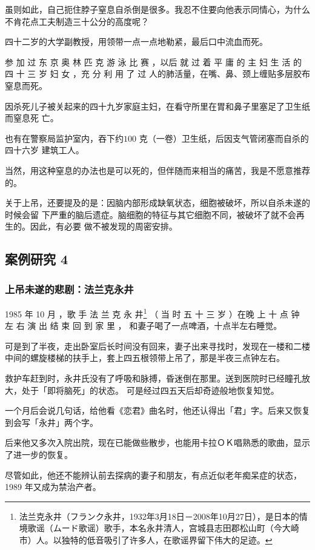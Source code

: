 \documentclass[UTF8]{ctexart}
\begin{document}
虽则如此，自己扼住脖子窒息自杀倒是很多。我忍不住要向他表示同情心，为什么不肯花点工夫制造三十公分的高度呢？

四十二岁的大学副教授，用领带一点一点地勒紧，最后口中流血而死。

参 加 过 东 京 奥 林 匹 克 游 泳 比 赛 ，以后 就 过 着 平 庸 的 主 妇 生 活 的 四 十 三 岁 妇 女 ，充 分 利 用 了 过 人的肺活量，在嘴、鼻、颈上缠贴多层胶布窒息而死。

因杀死儿子被关起来的四十九岁家庭主妇，在看守所里在胃和鼻子里塞足了卫生纸而窒息死
亡。

也有在警察局监护室内，吞下约$100$ 克（一卷）卫生纸，后因支气管闭塞而自杀的四十六岁
建筑工人。

当然，用这种窒息的办法也是可以死的，但伴随而来相当的痛苦，我是不愿意推荐的。

关于上吊，还要提及的是：因脑内部形成缺氧状态，细胞被破坏，所以自杀未遂的时候会留
下严重的脑后遗症。脑细胞的特征与其它细胞不同，被破坏了就不会再生的。因此，有必要
做不被发现的周密安排。

\subsection{案例研究 4}
\subsubsection*{上吊未遂的悲剧：法兰克永井}

1985 年 10 月 ，歌 手 法 兰 克 永 井\footnote{法兰克永井（フランク永井，1932年3月18日－2008年10月27日），是日本的情境歌谣（ムード歌谣）歌手，本名永井清人，宫城县志田郡松山町（今大崎市）人。以独特的低音吸引了许多人，在歌谣界留下伟大的足迹。} （ 当 时 五 十 三 岁 ）在晚 上 十 点 钟 左 右 演 出 结 束 回 到 家 里 ， 和妻子喝了一点啤酒，十点半左右睡觉。

可是到了半夜，走出卧室后长时间没有回来，妻子出来寻找时，发现在一楼和二楼中间的螺旋楼梯的扶手上，套上四五根领带上吊了，那是半夜三点钟左右。

救护车赶到时，永井氏没有了呼吸和脉搏，昏迷倒在那里。送到医院时已经瞳孔放大，处于「即将脑死」的状态。
可是经过四五天后却奇迹般地恢复知觉。

一个月后会说几句话，给他看《恋君》曲名时，他还认得出「君」字。后来又恢复到会写「永井」两个字。

后来他又多次入院出院，现在已能做些散步，也能用卡拉ＯＫ唱熟悉的歌曲，显示了进一步的恢复。

尽管如此，他还不能辨认前去探病的妻子和朋友，有点近似老年痴呆症的状态，1989 年又成为禁治产者。
\end{document}
